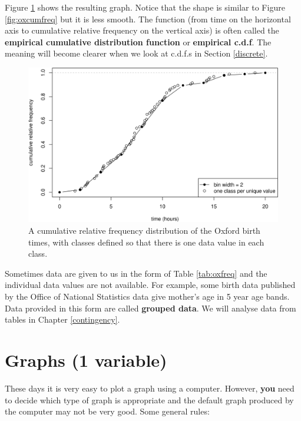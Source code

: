 \documentclass[
  11pt,
  british,
  openany, a4paper]{book}
\begin{document}
Figure \ref{fig:oxcumfreq2} shows the resulting graph. Notice that the shape is similar to Figure \ref{fig:oxcumfreq} but it is less smooth. The function (from time on the horizontal axis to cumulative relative frequency on the vertical axis) is often called the \textbf{empirical cumulative distribution function} or \textbf{empirical c.d.f}. The meaning will become clearer when we look at c.d.f.s in Section \ref{discrete}.

\begin{figure}

{\centering \includegraphics[width=0.75\linewidth]{images/ox_cum_freq2new} 

}

\caption{A cumulative relative frequency distribution of the Oxford birth times, with classes defined so that there is one data value in each class.}\label{fig:oxcumfreq2}
\end{figure}

Sometimes data are given to us in the form of Table \ref{tab:oxfreq} and the individual data values are not available. For example, some birth data published by the Office of National Statistics data give mother's age in 5 year age bands. Data provided in this form are called \textbf{grouped data}. We will analyse data from tables in Chapter \ref{contingency}.

\hypertarget{graphs}{%
\section{Graphs (1 variable)}\label{graphs}}

These days it is very easy to plot a graph using a computer. However, \textbf{you} need to decide which type of graph is appropriate and the default graph produced by the computer may not be very good. Some general rules:
\end{document}
